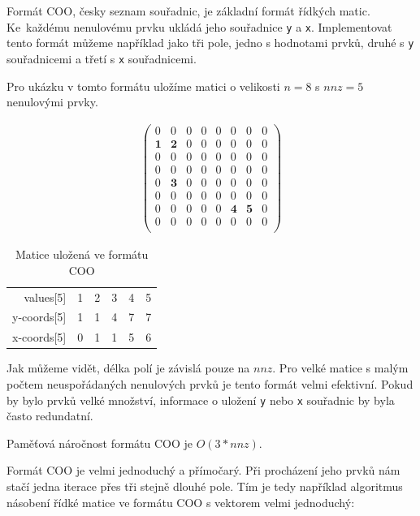 Formát COO, česky seznam souřadnic, je základní formát řídkých matic. Ke~každému nenulovému prvku ukládá jeho souřadnice \texttt{y} a \texttt{x}. Implementovat tento formát můžeme například jako tři pole, jedno s hodnotami prvků, druhé s \texttt{y} souřadnicemi a třetí s \texttt{x} souřadnicemi.

Pro ukázku v tomto formátu uložíme matici o velikosti $n=8$ s $nnz=5$ nenulovými prvky.

\begin{align}
\begin{pmatrix}
	0 & 0 & 0 & 0 & 0 & 0 & 0 & 0 \\
	\boldsymbol{1} & \boldsymbol{2} & 0 & 0 & 0 & 0 & 0 & 0 \\
	0 & 0 & 0 & 0 & 0 & 0 & 0 & 0 \\
	0 & 0 & 0 & 0 & 0 & 0 & 0 & 0 \\
	0 & \boldsymbol{3} & 0 & 0 & 0 & 0 & 0 & 0 \\
	0 & 0 & 0 & 0 & 0 & 0 & 0 & 0 \\
	0 & 0 & 0 & 0 & 0 & \boldsymbol{4} & \boldsymbol{5} & 0 \\
	0 & 0 & 0 & 0 & 0 & 0 & 0 & 0 \\	
\end{pmatrix}
\end{align}

\begin{table}[H]
    \begin{tabular}{r|lllll}
    values[5]   & 1 & 2 & 3 & 4 & 5 \\
    y-coords[5] & 1 & 1 & 4 & 7 & 7 \\
    x-coords[5] & 0 & 1 & 1 & 5 & 6 \\
    \end{tabular}
    \caption{Matice uložená ve formátu COO}
\end{table}

Jak můžeme vidět, délka polí je závislá pouze na $nnz$. Pro velké matice s malým počtem neuspořádaných nenulových prvků je tento formát velmi efektivní. Pokud by bylo prvků velké množství, informace o uložení \texttt{y} nebo \texttt{x} souřadnic by byla často redundatní.

Paměťová náročnost formátu COO je $O(3*nnz)$.

Formát COO je velmi jednoduchý a přímočarý. Při procházení jeho prvků nám stačí jedna iterace přes tři stejně dlouhé pole. Tím je tedy například algoritmus násobení řídké matice ve formátu COO s vektorem velmi jednoduchý:

